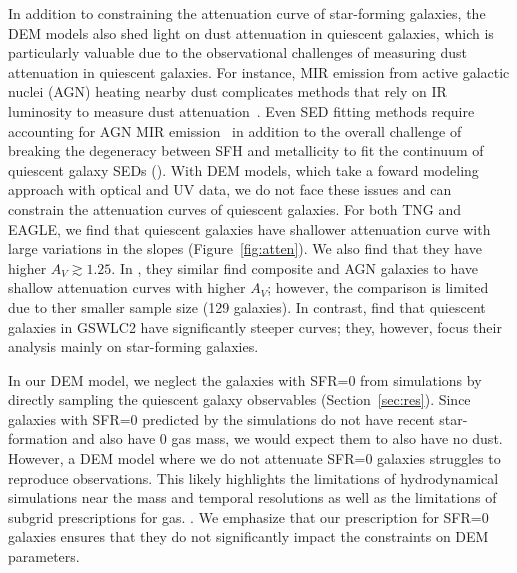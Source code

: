 In addition to constraining the attenuation curve of star-forming galaxies,
the DEM models also shed light on dust attenuation in quiescent galaxies, which
is particularly valuable due to the observational challenges of measuring dust 
attenuation in quiescent galaxies. For instance, MIR emission from active galactic
nuclei (AGN) heating nearby dust complicates methods that rely on IR luminosity 
to measure dust attenuation~\cite{kirkpatrick2015}. Even SED fitting methods
require accounting for AGN MIR emission~\citep{salim2016, leja2018, salim2018}
in addition to the overall challenge of breaking the degeneracy between SFH and
metallicity to fit the continuum of quiescent galaxy SEDs (). With DEM
models, which take a foward modeling approach with optical and UV data, we do
not face these issues and can constrain the attenuation curves of quiescent
galaxies. For both TNG and EAGLE, we find that quiescent galaxies have shallower attenuation curve
with large variations in the slopes (Figure~\ref{fig:atten}). We also find that they have higher $A_V
\gtrsim 1.25$.  
In \cite{leja2017}, they similar find composite and AGN galaxies
to have shallow attenuation curves with higher $A_V$; however, the comparison
is limited due to ther smaller sample size (129 galaxies). In contrast,  
\cite{salim2018} find that quiescent galaxies in GSWLC2 have significantly
steeper curves; they, however, focus their analysis mainly on star-forming 
galaxies.


In our DEM model, we neglect the galaxies with SFR=0 from simulations by
directly sampling the quiescent galaxy observables (Section~\ref{sec:res}).
Since galaxies with SFR=0 predicted by the simulations do not have recent 
star-formation and also have 0 gas mass, we would expect them to also have no dust. However, a DEM model
where we do not attenuate SFR=0 galaxies struggles to reproduce observations.
This likely highlights the limitations of hydrodynamical simulations near the
mass and temporal resolutions as well as the limitations of subgrid
prescriptions for gas. . 
We emphasize that our prescription for SFR=0 galaxies ensures that they do not
significantly impact the constraints on DEM parameters. 



